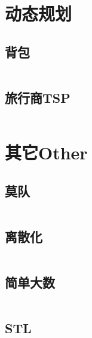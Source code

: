 \documentclass[twoside,sub3section,UTF8]{ctexart}						%
\begin{document}
\section{动态规划}
	\subsection{背包}
	\inputminted{c++}{"Dynamic Programme/bag.cpp"}
	\subsection{旅行商TSP}
	\inputminted{c++}{"Dynamic Programme/TSP.cpp"}




\newpage
\section{其它Other}
	\subsection{莫队}
	\inputminted{c++}{"Other/Mos.cpp"}
	\subsection{离散化}
	\inputminted{c++}{"Other/discretization.cpp"}
	\subsection{简单大数}
	\inputminted{c++}{"IO/BigInt.cpp"}	
	\subsection{STL}
	\inputminted{c++}{"Other/STL.cpp"}
\end{document}
